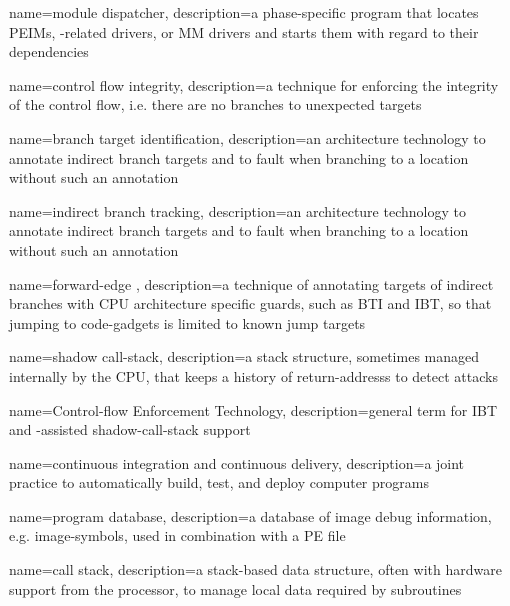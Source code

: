 {
  name={module dispatcher},
  description={a phase-specific program that locates \glspl{PEIM}, -related drivers, or \gls{MM} drivers and starts them with regard to their dependencies}
}

{
  name={control flow integrity},
  description={a technique for enforcing the integrity of the control flow, i.e. there are no branches to unexpected targets}
}

{
  name={branch target identification},
  description={an  architecture technology to annotate indirect branch targets and to fault when branching to a location without such an annotation}
}

{
  name={indirect branch tracking},
  description={an  architecture technology to annotate indirect branch targets and to fault when branching to a location without such an annotation}
}

{
  name={forward-edge },
  description={a technique of annotating targets of indirect branches with \gls{CPU} architecture specific guards, such as \gls{BTI} and \gls{IBT}, so that jumping to \glspl{code-gadget} is limited to known jump targets}
}

{
  name={shadow \gls{call-stack}},
  description={a stack structure, sometimes managed internally by the \gls{CPU}, that keeps a history of \glspl{return-address} to detect  attacks}
}

{
  name={Control-flow Enforcement Technology},
  description={general term for  \gls{IBT} and -assisted \gls{shadow-call-stack} support}
}

{
  name={continuous integration and continuous delivery},
  description={a joint practice to automatically build, test, and deploy computer programs}
}

{
  name={program database},
  description={a database of \gls{image} debug information, e.g. \glspl{image-symbol}, used in combination with a \gls{PE} file}
}

{
  name={call stack},
  description={a stack-based data structure, often with hardware support from the processor, to manage local data required by subroutines}
}

